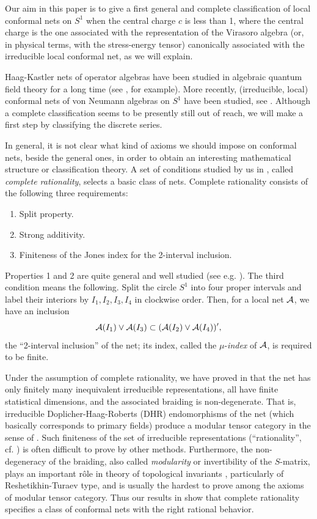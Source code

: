 \documentclass[12pt]{article}
\def\A{{\cal A}}
\begin{document}
Our aim in this paper is to give a first general and complete
classification of local conformal nets on $S^1$
when the central charge $c$ is less than 
1, where the central charge is the one associated with the 
representation of the Virasoro algebra (or, in physical terms, with the 
stress-energy tensor) canonically associated with 
the irreducible local conformal net, as we will explain.

Haag-Kastler nets of operator algebras have been studied in algebraic
quantum field theory for a long time (see \cite{H}, for example).
More recently, (irreducible, local) conformal nets of 
von Neumann algebras on $S^1$
have been studied, see  
\cite{BGL,C,DRL,FJ,FRS,FG,GL2,GLW,X3,X4,X5,X6,X7}.
Although a complete classification seems to be presently still
out of reach, we will make a first step 
by classifying the discrete series.

In general, it is not clear what kind of axioms we
should impose on conformal nets, beside the general ones, 
in order to obtain an interesting
mathematical structure or classification theory.
A set of conditions studied by us in \cite{KLM},
called {\sl complete rationality}, selects a basic class of nets.
Complete rationality consists of the following three requirements:
\begin{enumerate}
\item Split property.
\item Strong additivity.
\item Finiteness of the Jones index for the 2-interval inclusion.
\end{enumerate}
Properties 1 and 2 are quite general and well studied (see e.g. 
\cite{DL,GLW}). The third condition means the following.
Split the circle $S^1$ into four proper intervals and label their
interiors by $I_1, I_2, I_3, I_4$ in clockwise order.  Then,
for a local net $\A$, we have an inclusion
\[
\A(I_1)\vee \A(I_3)\subset (\A(I_2)\vee \A(I_4))' ,
\]
the ``2-interval inclusion'' of the net; its index, called the 
$\mu$-{\sl index} of $\A$, is required to be finite.

Under the assumption of complete rationality, we have proved
in \cite{KLM} that
the net has only finitely many inequivalent irreducible representations,
all have finite statistical dimensions, and the associated
braiding is non-degenerate.  That is, irreducible 
Doplicher-Haag-Roberts (DHR) endomorphisms of
the net (which basically corresponds to primary fields)
produce a modular tensor category in the sense of \cite{Tu}.
Such finiteness of the set of irreducible representations 
(``rationality'', cf. \cite{BPZ}) 
is often difficult to prove by other methods.
Furthermore, the non-degeneracy of the braiding,
also called {\sl modularity} or invertibility of the $S$-matrix,
plays an important r\^{o}le in theory of topological
invariants \cite{Tu}, particularly of Reshetikhin-Turaev type,
and is usually the hardest to prove among the axioms of modular
tensor category.  Thus our results in \cite{KLM} show that
complete rationality specifies a class of conformal nets with 
the right rational behavior.
\end{document}
